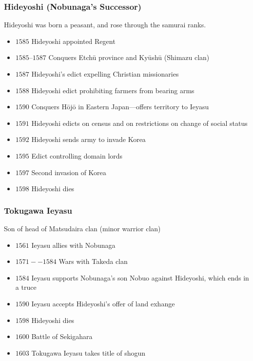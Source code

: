 \documentclass[class=article, crop=false]{standalone}
\begin{document}
  \subsubsection{Hideyoshi (Nobunaga's Successor)}
  Hideyoshi was born a peasant, and rose through the samurai ranks.
  \begin{itemize}
    \item $1585$ Hideyoshi appointed Regent
    \item $1585$--$1587$ Conquers Etch\=u province and Ky\=ush\=u (Shimazu clan)
    \item $1587$ Hideyoshi's edict expelling Christian missionaries
    \item $1588$ Hideyoshi edict prohibiting farmers from bearing arms
    \item $1590$ Conquers H\=oj\=o in Eastern Japan---offers territory to Ieyasu
    \item $1591$ Hideyoshi edicts on census and on restrictions on change of social status
    \item $1592$ Hideyoshi sends army to invade Korea
    \item $1595$ Edict controlling domain lords
    \item $1597$ Second invasion of Korea
    \item $1598$ Hideyoshi dies
  \end{itemize}
  \subsubsection{Tokugawa Ieyasu}
  Son of head of Matsudaira clan (minor warrior clan)
  \begin{itemize}
    \item $1561$ Ieyasu allies with Nobunaga
    \item $1571--1584$ Wars with Takeda clan
    \item $1584$ Ieyasu supports Nobunaga's son Nobuo against Hideyoshi, which ends in a truce
    \item $1590$ Ieyasu accepts Hideyoshi's offer of land exhange
    \item $1598$ Hideyoshi dies
    \item $1600$ Battle of Sekigahara
    \item $1603$ Tokugawa Ieyasu takes title of shogun
  \end{itemize}
\end{document}
